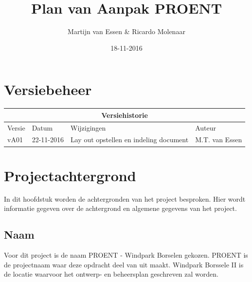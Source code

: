 \documentclass[numbers=endperiod]{scrartcl}
\title{Plan van Aanpak PROENT}
\date{18-11-2016}
\author{Martijn van Essen \& Ricardo Molenaar}
\begin{document}
	
	\newpage
	
	\setcounter{secnumdepth}{0} %
	\section{Versiebeheer}
	
	\begin{center}
		\begin{tabular}{| p{4cm} | l | p{7cm} | l |}
			\hline
			
			\multicolumn{4}{|c|}{
				\cellcolor{hhs_theme_heading_2}
				 Versiehistorie
			}  \\ \hline
			
			Versie 	& Datum 		& Wijzigingen 	& Auteur \\ \hline
			vA01 	& 22-11-2016 	& Lay out opstellen en indeling document & M.T. van Essen\\ \hline
		\end{tabular}
	\end{center}
	\newpage
	
	\renewcommand{\contentsname}{Inhoudsopgave} %
	\setcounter{tocdepth}{2}%
	\tableofcontents
	\newpage
	
	\setcounter{secnumdepth}{3}%

	\section{Projectachtergrond}
	In dit hoofdstuk worden de achtergronden van het project besproken. Hier wordt informatie gegeven over de achtergrond en algemene gegevens van het project.
	
	\subsection{Naam}
	Voor dit project is de naam PROENT - Windpark Borselen gekozen. PROENT is de projectnaam waar deze opdracht deel van uit maakt. Windpark Borssele II is de locatie waarvoor het ontwerp- en beheersplan geschreven zal worden.
\end{document}

